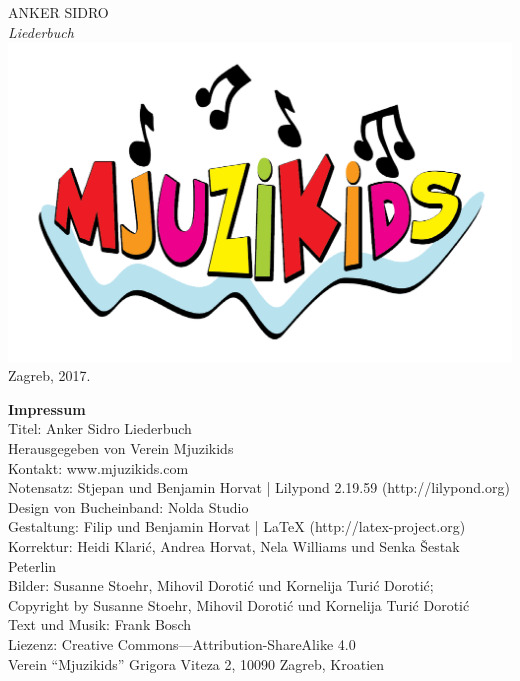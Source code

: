 \documentclass[a4paper,twoside, svgnames]{article}
\newcommand{\impresspac}{7pt}
\newcommand*{\titleTH}{\begingroup
\vspace*{5cm}
\begin{center}
{{\fontsize{50}{60}\selectfont
\textsf{\textcolor{anker}{ANKER} \textcolor{sidro}{SIDRO}}}}\\
\vspace*{0.3cm}
{\fontsize{69}{80}\selectfont
\itshape\textrm{Liederbuch}}
\vfill %
\includegraphics[width=0.2\linewidth]{images/mjuzikids_logo}\\
\vspace*{0.5cm}
{Zagreb, 2017.}\par %
\end{center}
\endgroup}
\begin{document}
\thispagestyle {empty}
\titleTH

\newpage
\thispagestyle {empty}
\begin{center}
\vspace*{\fill}
\begin{onehalfspacing}
\textbf{\textsf{Impressum}}\\
\vspace{10pt}
Titel: Anker Sidro Liederbuch\\
\vspace{\impresspac}
Herausgegeben von Verein Mjuzikids\\
\vspace{\impresspac}
Kontakt: www.mjuzikids.com\\
\vspace{\impresspac}
Notensatz: Stjepan und Benjamin Horvat | Lilypond 2.19.59 (http://lilypond.org)\\
\vspace{\impresspac}
Design von Bucheinband: Nolda Studio\\
\vspace{\impresspac}
Gestaltung: Filip und Benjamin Horvat | LaTeX (http://latex-project.org) \\
\vspace{\impresspac}
Korrektur: Heidi Klarić, Andrea Horvat, Nela Williams und Senka Šestak Peterlin\\
\vspace{\impresspac}
Bilder: Susanne Stoehr, Mihovil Dorotić und Kornelija Turić Dorotić;\\
Copyright by Susanne Stoehr, Mihovil Dorotić und Kornelija Turić Dorotić\\
\vspace{\impresspac}
Text und Musik: Frank Bosch\\
\vspace{\impresspac}
Liezenz: Creative Commons—Attribution-ShareAlike 4.0\\
\vspace{\impresspac}
Verein “Mjuzikids” Grigora Viteza 2, 10090 Zagreb, Kroatien\\
\vspace{\impresspac}
\vspace{\impresspac}

\end{onehalfspacing}
\end{center}
\end{document}
